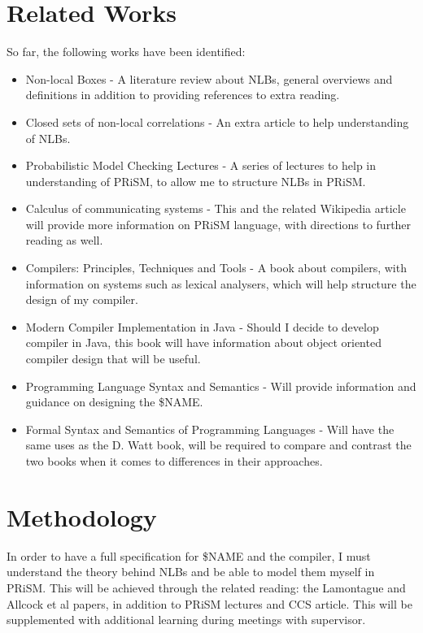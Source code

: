 \documentclass[11pt, a4paper]{article}
\begin{document}
\section{Related Works} %
\label{sec:related_works}
So far, the following works have been identified:
\begin{itemize}
    \item Non-local Boxes \cite{nlb_lamontague} - A literature review about
    NLBs, general overviews and definitions in addition to providing references
    to extra reading.
    \item Closed sets of non-local correlations
    \cite{Jonathan-Allcock:2009pd} - An extra article to help understanding
    of NLBs.
    \item Probabilistic Model Checking Lectures \cite{prism_lectures} - A
    series of lectures to help in understanding of PRiSM, to allow me to
    structure NLBs in PRiSM.
    \item Calculus of communicating systems \cite{ccs} - This and the related
    Wikipedia article will provide more information on PRiSM language, with
    directions to further reading as well. 
    \item Compilers: Principles, Techniques and Tools
    \cite{dragon_compiler} - A book about compilers, with information on
    systems such as lexical analysers, which will help structure the design of
    my compiler.
    \item Modern Compiler Implementation in Java \cite{java_compiler} -
    Should I decide to develop compiler in Java, this book will have information
    about object oriented compiler design that will be useful.
    \item Programming Language Syntax and Semantics \cite{plss} - Will
    provide information and guidance on designing the \$NAME.
    \item Formal Syntax and Semantics of Programming Languages \cite{fsspl}
    - Will have the same uses as the D. Watt book, will be required to compare
    and contrast the two books when it comes to differences in their approaches.
\end{itemize}


\section{Methodology} %
\label{sec:methodology}
In order to have a full specification for \$NAME and the compiler, I must 
understand the theory behind NLBs and be able to model them myself in PRiSM.
This will be achieved through the related reading: the Lamontague and Allcock et
al papers, in addition to PRiSM lectures and CCS article. This will be
supplemented with additional learning during meetings with supervisor.
\end{document}
